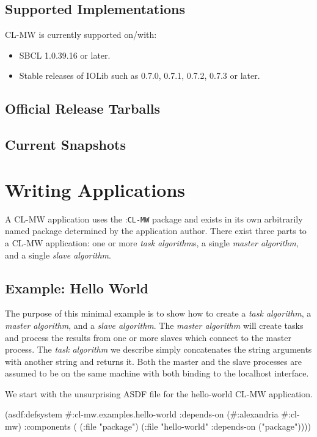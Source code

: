 \documentclass[titlepage,12pt]{book}
\newcommand{\xsmall}{\latexhtml{\small}{}}
\newcommand{\xnormalsize}{\latexhtml{\normalsize}{}}
\newcommand{\clmw}{\xsmall\textsc{CL-MW}\xnormalsize\xspace}
\newcommand{\package}[1]{\mbox{:\uppercase{\xsmall\texttt{#1}\xnormalsize}} package\xspace}
\newcommand{\mwpackage}{\package{CL-MW}}
\newcommand{\sa}{\textit{slave algorithm}\xspace}
\newcommand{\ma}{\textit{master algorithm}\xspace}
\newcommand{\ta}{\textit{task algorithm}\xspace}
\newcommand{\tas}{\textit{task algorithm}s\xspace}
\newcommand{\file}[1]{\texttt{#1}\xspace}
\newcommand{\Todo}{\begin{center}\fbox{\textbf{TODO}}\end{center}}
\begin{document}
\section{Supported Implementations}

\clmw is currently supported on/with: 

\begin{itemize}
\item SBCL 1.0.39.16 or later.
\item Stable releases of IOLib such as 0.7.0, 0.7.1, 0.7.2, 0.7.3 or later.
\end{itemize}

\section{Official Release Tarballs}

\Todo

\section{Current Snapshots}

\Todo

\chapter{Writing Applications}

A \clmw application uses the \mwpackage and exists in its own
arbitrarily named package determined by the application author.
There exist three parts to a \clmw application: one or more \tas,
a single \ma, and a single \sa.

\section{Example: Hello World}

The purpose of this minimal example is to show how to create a \ta,
a \ma, and a \sa. The \ma will create tasks and process the results
from one or more slaves which connect to the master process. The \ta we
describe simply concatenates the string arguments with another string
and returns it. Both the master and the slave processes are assumed
to be on the same machine with both binding to the localhost interface.

We start with the unsurprising ASDF file for the hello-world \clmw application.

\begin{lisp}[caption=\file{cl-mw.examples.hello-world.asd}]
(asdf:defsystem #:cl-mw.examples.hello-world
  :depends-on (#:alexandria #:cl-mw)
  :components ( (:file "package")
                (:file "hello-world"
                       :depends-on ("package"))))
\end{lisp}
\end{document}
